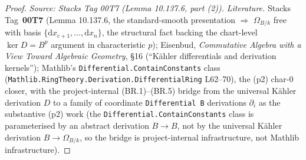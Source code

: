 \begin{proof}
  \textit{Source: Stacks Tag 00T7 (Lemma 10.137.6, part (2)).}
  \emph{Literature.} Stacks Tag~\textbf{00T7} (Lemma 10.137.6, the standard-smooth presentation \(\Rightarrow\) \(\Omega_{B/k}\) free with basis \(\{\mathrm dx_{c+1}, \ldots, \mathrm dx_n\}\), the structural fact backing the chart-level \(\ker D = B^p\) argument in characteristic \(p\)); Eisenbud, \emph{Commutative Algebra with a View Toward Algebraic Geometry}, \S 16 (``K\"ahler differentials and derivation kernels''); Mathlib's \texttt{Differential.ContainConstants} class (\texttt{Mathlib.RingTheory.Derivation.DifferentialRing} L62--70), the (p2) char-\(0\) closer, with the project-internal (BR.1)--(BR.5) bridge from the universal K\"ahler derivation \(D\) to a family of coordinate \texttt{Differential B} derivations \(\partial_i\) as the substantive (p2) work (the \texttt{Differential.ContainConstants} class is parameterised by an abstract derivation \(B \to B\), not by the universal K\"ahler derivation \(B \to \Omega_{B/k}\), so the bridge is project-internal infrastructure, not Mathlib infrastructure).
\end{proof}

